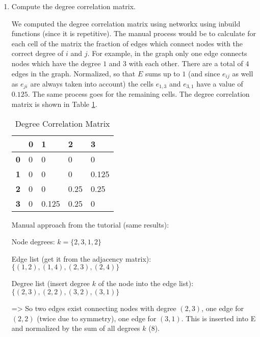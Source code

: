 

\begin{enumerate}
	\item Compute the degree correlation matrix.
	
	We computed the degree correlation matrix using networkx using inbuild functions (since it is repetitive).  The manual process would be to calculate for each cell of the matrix the fraction of edges which connect nodes with the correct degree of $i$ and $j$.  For example,  in the graph only one edge connects nodes which have the degree $1$ and $3$ with each other.  There are a total of $4$ edges in the graph.  Normalized, so that $E$ sums up to $1$ (and since $e_{ij}$ as well as $e_{ji}$ are always taken into account) the cells $e_{1,3}$ and $e_{3,1}$ have a value of $0.125$. The same process goes for the remaining cells. The degree correlation matrix is shown in Table \ref{tab:deg_corr_mat}.
	
	\begin{table}[h]
	\centering
	\begin{tabular}{lllll}
		\hline
		\textbf{}  & \textbf{0} & \textbf{1} & \textbf{2} & \textbf{3} \\ \hline
		\textbf{0} & 0          & 0          & 0          & 0          \\ \hline
		\textbf{1} & 0          & 0          & 0          & 0.125      \\ \hline
		\textbf{2} & 0          & 0          & 0.25       & 0.25       \\ \hline
		\textbf{3} & 0          & 0.125      & 0.25       & 0          \\ \hline
	\end{tabular}
	\caption{Degree Correlation Matrix}
	\label{tab:deg_corr_mat}
	\end{table}

	Manual approach from the tutorial (same results):
	
	Node degrees: $ k = \{2,3,1,2\}$

	Edge list (get it from the adjacency matrix): $\{(1,2), (1,4), (2,3), (2,4)\}$
	
	Degree list (insert degree $k$ of the node into the edge list): $\{(2,3), (2,2), (3,2), (3,1)\}$
	
	=> So two edges exist connecting nodes with degree $(2,3)$, one edge for $(2,2)$ (twice due to symmetry), one edge for $(3,1)$. This is inserted into E and normalized by the sum of all degrees $k$ ($8$).
	

\end{enumerate}
